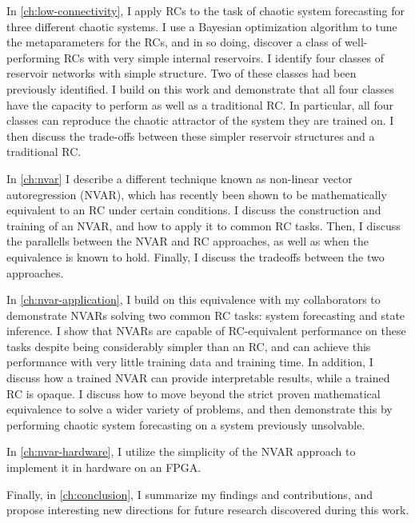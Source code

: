 In \cref{ch:low-connectivity}, I apply RCs to the task of chaotic
system forecasting for three different chaotic systems. I use a
Bayesian optimization algorithm to tune the metaparameters for the
RCs, and in so doing, discover a class of well-performing RCs with very
simple internal reservoirs. I identify four classes of reservoir
networks with simple structure. Two of these classes had been
previously identified. I build on this work and demonstrate that all
four classes have the capacity to perform as well as a traditional
RC. In particular, all four classes can reproduce the chaotic
attractor of the system they are trained on. I then discuss the
trade-offs between these simpler reservoir structures and a
traditional RC.

In \cref{ch:nvar} I describe a different technique known as
non-linear vector autoregression (NVAR), which has recently been shown
to be mathematically equivalent to an RC under certain conditions. I
discuss the construction and training of an NVAR, and how to apply it
to common RC tasks. Then, I discuss the parallells between the NVAR
and RC approaches, as well as when the equivalence is known to
hold. Finally, I discuss the tradeoffs between the two approaches.

In \cref{ch:nvar-application}, I build on this equivalence with my
collaborators to demonstrate NVARs solving two common RC tasks: system
forecasting and state inference. I show that NVARs are capable of
RC-equivalent performance on these tasks despite being considerably
simpler than an RC, and can achieve this performance with very little
training data and training time. In addition, I discuss how a trained
NVAR can provide interpretable results, while a trained RC is
opaque. I discuss how to move beyond the strict proven mathematical
equivalence to solve a wider variety of problems, and then demonstrate
this by performing chaotic system forecasting on a system previously
unsolvable.

In \cref{ch:nvar-hardware}, I utilize the simplicity of the NVAR
approach to implement it in hardware on an FPGA.

Finally, in \cref{ch:conclusion}, I summarize my findings and
contributions, and propose interesting new directions for future
research discovered during this work.
